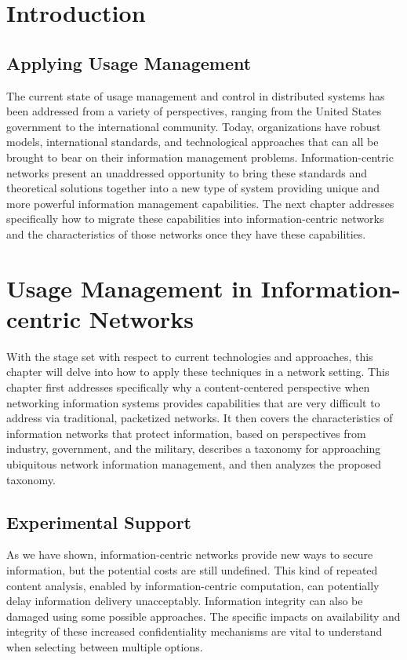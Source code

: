 \documentclass[botnum,fleqn,final]{unmeethesis}
\begin{document}
\mainmatter

\chapter{Introduction}







\section{Applying Usage Management}
The current state of usage management and control in distributed systems has been addressed from a variety of perspectives, ranging from the United States government to the international community.  Today, organizations have robust models, international standards, and technological approaches that can all be brought to bear on their information management problems.  Information-centric networks present an unaddressed opportunity to bring these standards and theoretical solutions together into a new type of system providing unique and more powerful information management capabilities.  The next chapter addresses specifically how to migrate these capabilities into information-centric networks and the characteristics of those networks once they have these capabilities.

\chapter{Usage Management in Information-centric Networks}
With the stage set with respect to current technologies and approaches, this chapter will delve into how to apply these techniques in a network setting.  This chapter first addresses specifically why a content-centered perspective when networking information systems provides capabilities that are very difficult to address via traditional, packetized networks.  It then covers the characteristics of information networks that protect information, based on perspectives from industry, government, and the military, describes a taxonomy for approaching ubiquitous network information management, and then analyzes the proposed taxonomy.




\section{Experimental Support}
As we have shown, information-centric networks provide new ways to secure information, but the potential costs are still undefined.  This kind of repeated content analysis, enabled by information-centric computation, can potentially delay information delivery unacceptably.  Information integrity can also be damaged using some possible approaches.  The specific impacts on availability and integrity of these increased confidentiality mechanisms are vital to understand when selecting between multiple options.
\end{document}
